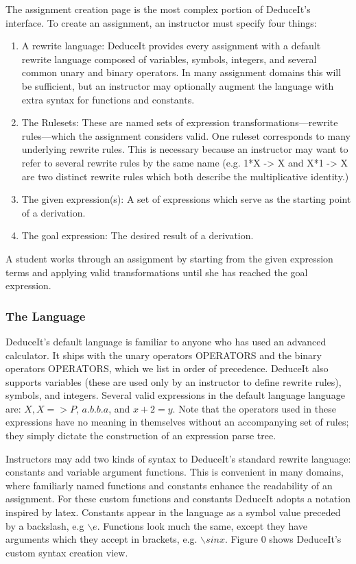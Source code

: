 \documentclass{sigchi}
\begin{document}
The assignment creation page is the most complex portion of DeduceIt's interface. To create an assignment, an instructor must specify four things: 
  \begin{enumerate}
  \item A rewrite language: DeduceIt provides every assignment with a default rewrite language composed of variables, symbols, integers, and several common unary and binary operators. In many assignment domains this will be sufficient, but an instructor may optionally augment the language with extra syntax for functions and constants. 
  \item The Rulesets: These are named sets of expression transformations---rewrite rules---which the assignment considers valid. One ruleset corresponds to many underlying rewrite rules. This is necessary because an instructor may want to refer to several rewrite rules by the same name (e.g. 1*X -> X and X*1 -> X are two distinct rewrite rules which both describe the multiplicative identity.)
  \item The given expression(s): A set of expressions which serve as the starting point of a derivation.
  \item The goal expression: The desired result of a derivation.
  \end{enumerate}

A student works through an assignment by starting from the given expression terms and applying valid transformations until she has reached the goal expression.

\subsubsection{The Language}

DeduceIt's default language is familiar to anyone who has used an advanced calculator. It ships with the unary operators OPERATORS and the binary operators OPERATORS, which we list in order of precedence. DeduceIt also supports variables (these are used only by an instructor to define rewrite rules), symbols, and integers. Several valid expressions in the default language language are: $X,X=>P$, $a.b.b.a$, and $x+2=y$. Note that the operators used in these expressions have no meaning in themselves without an accompanying set of rules; they simply dictate the construction of an expression parse tree.

Instructors may add two kinds of syntax to DeduceIt's standard rewrite language: constants and variable argument functions. This is convenient in many domains, where familiarly named functions and constants enhance the readability of an assignment. For these custom functions and constants DeduceIt adopts a notation inspired by latex. Constants appear in the language as a symbol value preceded by a backslash, e.g $\backslash{}e$. Functions look much the same, except they have arguments which they accept in brackets, e.g. $\backslash{}sin{x}$. Figure 0 shows DeduceIt's custom syntax creation view.
\end{document}
